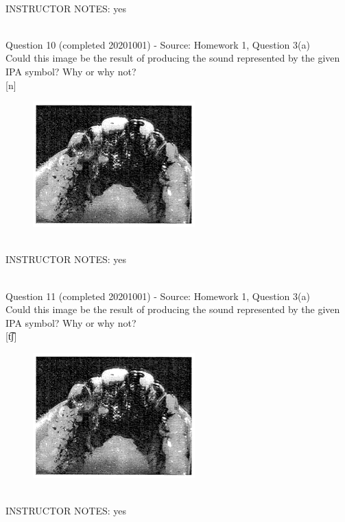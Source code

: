 \documentclass[12pt]{article}
\begin{document}
~\\
INSTRUCTOR NOTES: yes


~\\

{\large Question 10} (completed 20201001) - Source: Homework 1, Question 3(a)\\

Could this image be the result of producing the sound represented by the given IPA symbol? Why or why not?\\

{[n]}

\begin{figure}[H]
\includegraphics{../images/staticpalatography_stop.png}
\end{figure}

~\\
INSTRUCTOR NOTES: yes


~\\

{\large Question 11} (completed 20201001) - Source: Homework 1, Question 3(a)\\

Could this image be the result of producing the sound represented by the given IPA symbol? Why or why not?\\

{[t͡ʃ]}

\begin{figure}[H]
\includegraphics{../images/staticpalatography_stop.png}
\end{figure}

~\\
INSTRUCTOR NOTES: yes
\end{document}

